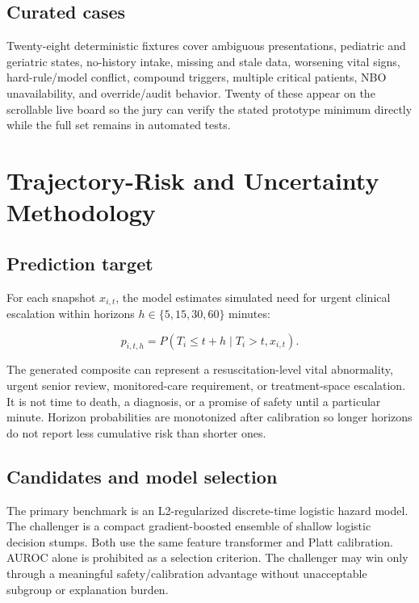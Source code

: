 \documentclass[11pt,a4paper]{article}
\begin{document}
\subsection{Curated cases}

Twenty-eight deterministic fixtures cover ambiguous presentations, pediatric and geriatric states, no-history intake, missing and stale data, worsening vital signs, hard-rule/model conflict, compound triggers, multiple critical patients, NBO unavailability, and override/audit behavior. Twenty of these appear on the scrollable live board so the jury can verify the stated prototype minimum directly while the full set remains in automated tests.

\section{Trajectory-Risk and Uncertainty Methodology}

\subsection{Prediction target}

For each snapshot $x_{i,t}$, the model estimates simulated need for urgent clinical escalation within horizons $h\in\{5,15,30,60\}$ minutes:

\begin{equation}
p_{i,t,h}=P(T_i \le t+h\mid T_i>t, x_{i,t}).
\end{equation}

The generated composite can represent a resuscitation-level vital abnormality, urgent senior review, monitored-care requirement, or treatment-space escalation. It is not time to death, a diagnosis, or a promise of safety until a particular minute. Horizon probabilities are monotonized after calibration so longer horizons do not report less cumulative risk than shorter ones.

\subsection{Candidates and model selection}

The primary benchmark is an L2-regularized discrete-time logistic hazard model. The challenger is a compact gradient-boosted ensemble of shallow logistic decision stumps. Both use the same feature transformer and Platt calibration. AUROC alone is prohibited as a selection criterion. The challenger may win only through a meaningful safety/calibration advantage without unacceptable subgroup or explanation burden.
\end{document}
